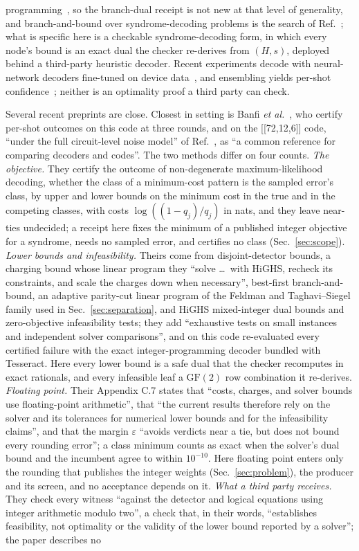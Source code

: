 \documentclass[aps,pra,twocolumn,superscriptaddress,nofootinbib,longbibliography,floatfix]{revtex4-2}
\newcommand{\GF}{\mathrm{GF}(2)}
\begin{document}
programming~\cite{cheung2017verifying,eifler2023computational,steffy2013valid}, so the branch-dual receipt is not new at that level of generality, and branch-and-bound over syndrome-decoding problems is the search of Ref.~\cite{banfi2026certified}; what is specific here is a checkable syndrome-decoding form, in which every node's bound is an exact dual the checker re-derives from $(H,s)$, deployed behind a third-party heuristic decoder. Recent experiments decode with neural-network decoders fine-tuned on device data~\cite{google2025below}, and ensembling yields per-shot confidence~\cite{shutty2024efficient}; neither is an optimality proof a third party can check.

Several recent preprints are close. Closest in setting is Banfi \textit{et al.}~\cite{banfi2026certified}, who certify per-shot outcomes on this code at three rounds, and on the [[72,12,6]] code, ``under the full circuit-level noise model'' of Ref.~\cite{bravyi2024high}, as ``a common reference for comparing decoders and codes''. The two methods differ on four counts. \emph{The objective.} They certify the outcome of non-degenerate maximum-likelihood decoding, whether the class of a minimum-cost pattern is the sampled error's class, by upper and lower bounds on the minimum cost in the true and in the competing classes, with costs $\log((1-q_j)/q_j)$ in nats, and they leave near-ties undecided; a receipt here fixes the minimum of a published integer objective for a syndrome, needs no sampled error, and certifies no class (Sec.~\ref{sec:scope}). \emph{Lower bounds and infeasibility.} Theirs come from disjoint-detector bounds, a charging bound whose linear program they ``solve \ldots\ with HiGHS, recheck its constraints, and scale the charges down when necessary'', best-first branch-and-bound, an adaptive parity-cut linear program of the Feldman and Taghavi--Siegel family used in Sec.~\ref{sec:separation}, and HiGHS mixed-integer dual bounds and zero-objective infeasibility tests; they add ``exhaustive tests on small instances and independent solver comparisons'', and on this code re-evaluated every certified failure with the exact integer-programming decoder bundled with Tesseract. Here every lower bound is a safe dual that the checker recomputes in exact rationals, and every infeasible leaf a $\GF$ row combination it re-derives. \emph{Floating point.} Their Appendix C.7 states that ``costs, charges, and solver bounds use floating-point arithmetic'', that ``the current results therefore rely on the solver and its tolerances for numerical lower bounds and for the infeasibility claims'', and that the margin $\varepsilon$ ``avoids verdicts near a tie, but does not bound every rounding error''; a class minimum counts as exact when the solver's dual bound and the incumbent agree to within $10^{-10}$. Here floating point enters only the rounding that publishes the integer weights (Sec.~\ref{sec:problem}), the producer and its screen, and no acceptance depends on it. \emph{What a third party receives.} They check every witness ``against the detector and logical equations using integer arithmetic modulo two'', a check that, in their words, ``establishes feasibility, not optimality or the validity of the lower bound reported by a solver''; the paper describes no 
\end{document}
